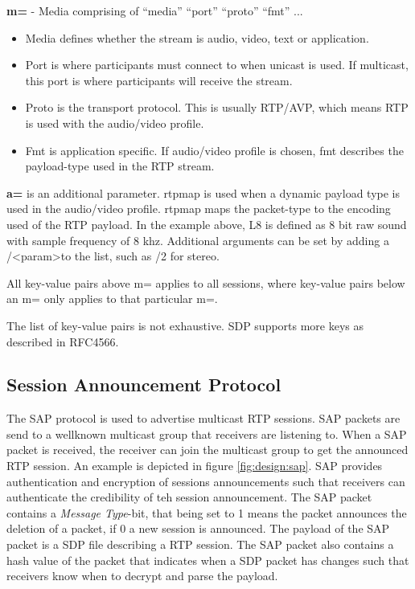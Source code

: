 \textbf{m=} - Media comprising of ``media'' ``port'' ``proto'' ``fmt'' ...
\begin{itemize}
	\item Media defines whether the stream is audio, video, text or application.
	\item Port is where participants must connect to when unicast is used. If multicast, this port is where participants will receive the stream.
	\item Proto is the transport protocol. This is usually RTP/AVP, which means RTP is used with the audio/video profile.
	\item Fmt is application specific. If audio/video profile is chosen, fmt describes the payload-type used in the RTP stream.
\end{itemize}
\textbf{a=} is an additional parameter. rtpmap is used when a dynamic payload type is used in the audio/video profile. rtpmap maps the packet-type to the encoding used of the RTP payload. In the example above, L8 is defined as 8 bit raw sound with sample frequency of 8 khz. Additional arguments can be set by adding a /\textless param\textgreater to the list, such as /2 for stereo.

All key-value pairs above m= applies to all sessions, where key-value pairs below an m= only applies to that particular m=. 

The list of key-value pairs is not exhaustive. SDP supports more keys as described in RFC4566.


\subsection{Session Announcement Protocol} \label{sec:design:sap}
The \ac{SAP} protocol is used to advertise multicast RTP sessions. SAP packets are send to a wellknown multicast group that receivers are listening to. When a SAP packet is received, the receiver can join the multicast group to get the announced RTP session. An example is depicted in figure \ref{fig:design:sap}. SAP provides authentication and encryption of sessions announcements such that receivers can authenticate the credibility of teh session announcement. The SAP packet contains a \textit{Message Type}-bit, that being set to 1 means the packet announces the deletion of a packet, if 0 a new session is announced. The payload of the SAP packet is a SDP file describing a RTP session. The SAP packet also contains a hash value of the packet that indicates when a SDP packet has changes such that receivers know when to decrypt and parse the payload. \citep{RFC2974}


